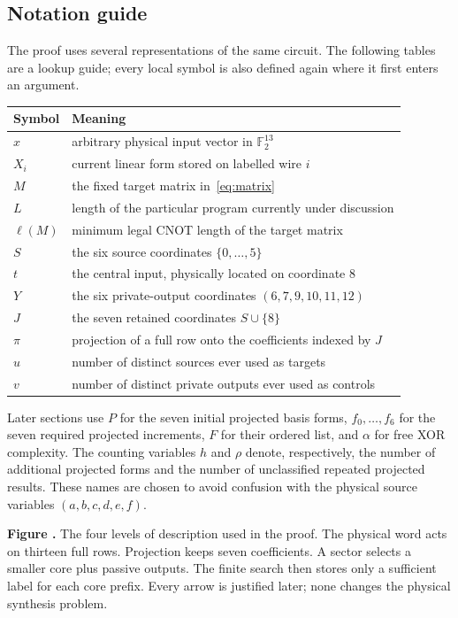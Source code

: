 \documentclass[11pt]{article}
\newcommand{\F}{\mathbb F_2}
\newcommand{\cost}{\ell}
\newcommand{\prooffigure}[3]{%
  \begin{center}
  \begin{minipage}{.98\linewidth}
  \centering
  \resizebox{\linewidth}{!}{}\par
  \refstepcounter{figure}\label{#2}%
  \small\textbf{Figure \thefigure.} #3
  \end{minipage}
  \end{center}}
\begin{document}
\subsection{Notation guide}
The proof uses several representations of the same circuit. The following
tables are a lookup guide; every local symbol is also defined again where it
first enters an argument.
\begin{center}\begin{tabular}{lp{.71\linewidth}}\toprule
Symbol&Meaning\\\midrule
$x$&arbitrary physical input vector in $\F^{13}$\\
$X_i$&current linear form stored on labelled wire $i$\\
$M$&the fixed target matrix in~\eqref{eq:matrix}\\
$L$&length of the particular program currently under discussion\\
$\cost(M)$&minimum legal CNOT length of the target matrix\\
$S$&the six source coordinates $\{0,\ldots,5\}$\\
$t$&the central input, physically located on coordinate 8\\
$Y$&the six private-output coordinates $(6,7,9,10,11,12)$\\
$J$&the seven retained coordinates $S\cup\{8\}$\\
$\pi$&projection of a full row onto the coefficients indexed by $J$\\
$u$&number of distinct sources ever used as targets\\
$v$&number of distinct private outputs ever used as controls\\\bottomrule
\end{tabular}\end{center}

Later sections use $P$ for the seven initial projected basis forms,
$f_0,\ldots,f_6$ for the seven required projected increments, $F$ for their
ordered list, and $\alpha$ for free XOR complexity. The counting variables
$h$ and $\rho$ denote, respectively, the number of additional projected
forms and the number of unclassified repeated projected results. These names
are chosen to avoid confusion with the physical source variables
$(a,b,c,d,e,f)$.
\prooffigure{representation_layers}{fig:representation-layers}{The four
levels of description used in the proof. The physical word acts on thirteen
full rows. Projection keeps seven coefficients. A sector selects a smaller
core plus passive outputs. The finite search then stores only a sufficient
label for each core prefix. Every arrow is justified later; none changes the
physical synthesis problem.}
\end{document}
